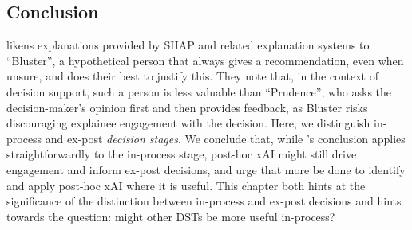 \subsection{Conclusion}
\textcite{miller_explainable_2023} likens explanations provided by SHAP and related explanation systems to ``Bluster'', a hypothetical person that always gives a recommendation, even when unsure, and does their best to justify this. They note that, in the context of decision support, such a person is less valuable than ``Prudence'', who asks the decision-maker's opinion first and then provides feedback, as Bluster risks discouraging explainee engagement with the decision. Here, we distinguish in-process and ex-post \emph{decision stages}. We conclude that, while \textcite{miller_explainable_2023}'s conclusion applies straightforwardly to the in-process stage, post-hoc xAI might still drive engagement and inform ex-post decisions, and urge that more be done to identify and apply post-hoc xAI where it is useful. This chapter both hints at the significance of the distinction between in-process and ex-post decisions and hints towards the question: might other DSTs be more useful in-process?
